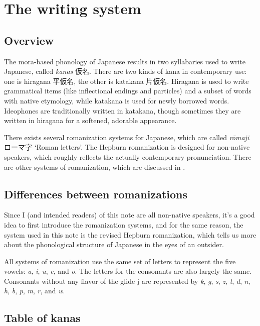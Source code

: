 \documentclass[UTF8, a4paper, oneside, scheme=plain]{ctexrep}
\newcommand*{\term}[1]{\emph{#1}}
\newcommand{\corpus}[1]{\emph{#1}}
\newcommand{\translate}[1]{`#1'}
\begin{document}
\section{The writing system}

\subsection{Overview}

The mora-based phonology of Japanese results in two syllabaries used to write Japanese,
called \term{kanas} 仮名.
There are two kinds of kana in contemporary use:
one is hiragana 平仮名, the other is katakana 片仮名.
Hiragana is used to write grammatical items (like inflectional endings and particles)
and a subset of words with native etymology,
while katakana is used for newly borrowed words.
Ideophones are traditionally written in katakana,
though sometimes they are written in hiragana for a softened, adorable appearance.

There exists several romanization systems for Japanese,
which are called \corpus{rōmaji} ローマ字 \translate{Roman letters}.
The Hepburn romanization is designed for non-native speakers,
which roughly reflects the actually contemporary pronunciation.
There are other systems of romanization, which are discussed in .

\subsection{Differences between romanizations}\label{sec:romanization}

Since I (and intended readers) of this note are all non-native speakers,
it's a good idea to first introduce the romanization systems,
and for the same reason,
the system used in this note is the revised Hepburn romanization,
which tells us more about the phonological structure of Japanese 
in the eyes of an outsider.

All systems of romanization use the same set of letters to represent the five vowels:
\corpus{a}, \corpus{i}, \corpus{u}, \corpus{e}, and \corpus{o}.
The letters for the consonants are also largely the same.
Consonants without any flavor of the glide j are represented by 
\corpus{k}, \corpus{g}, \corpus{s}, \corpus{z}, \corpus{t}, \corpus{d}, \corpus{n}, 
\corpus{h}, \corpus{b}, \corpus{p}, \corpus{m}, \corpus{r}, and \corpus{w}.



\subsection{Table of kanas}\label{sec:kana}
\end{document}
